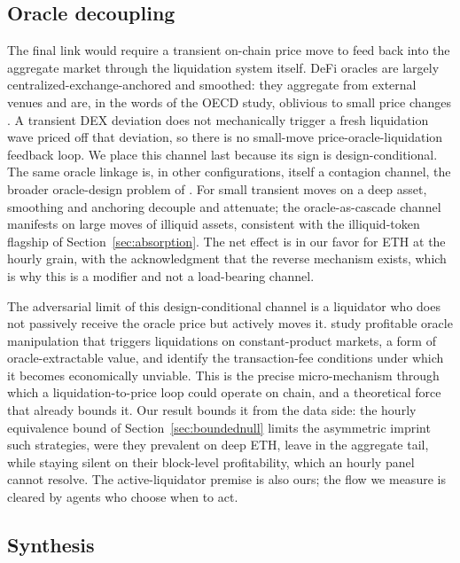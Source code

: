 \subsection{Oracle decoupling}
\label{sec:oracle}

The final link would require a transient on-chain price move to feed back
into the aggregate market through the liquidation system itself. DeFi
oracles are largely centralized-exchange-anchored and smoothed: they
aggregate from external venues and are, in the words of the OECD study,
oblivious to small price changes \citep{oecd2023}. A transient
DEX deviation does not mechanically trigger a fresh liquidation wave priced
off that deviation, so there is no small-move price-oracle-liquidation
feedback loop. We place this channel last because its sign is
design-conditional. The same oracle linkage is, in other configurations,
itself a contagion channel, the broader oracle-design problem of
\citet{caldarelli2020}.
For small transient moves on a deep asset, smoothing and anchoring decouple
and attenuate; the oracle-as-cascade channel manifests on large moves of
illiquid assets, consistent with the illiquid-token flagship of
Section~\ref{sec:absorption}. The net effect is in our favor for ETH at the
hourly grain, with the acknowledgment that the reverse mechanism
exists, which is why this is a modifier and not a load-bearing channel.

The adversarial limit of this design-conditional channel is a liquidator who
does not passively receive the oracle price but actively moves it.
\citet{sadeghi2026} study profitable oracle manipulation that triggers
liquidations on constant-product markets, a form of oracle-extractable value,
and identify the transaction-fee conditions under which it becomes
economically unviable. This is the precise micro-mechanism through which a
liquidation-to-price loop could operate on chain, and a theoretical force that
already bounds it. Our result bounds it from the data side: the hourly
equivalence bound of Section~\ref{sec:boundednull} limits the asymmetric
imprint such strategies, were they prevalent on deep ETH, leave in the
aggregate tail, while staying silent on their block-level profitability, which
an hourly panel cannot resolve. The active-liquidator premise is also ours;
the flow we measure is cleared by agents who choose when to act.

\subsection{Synthesis}

